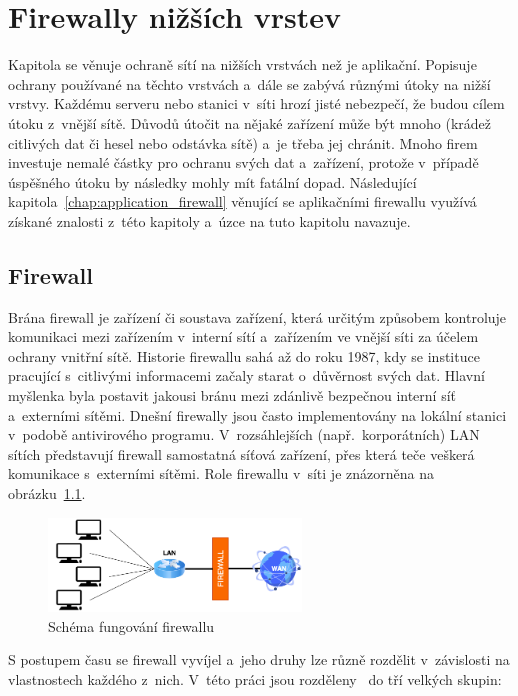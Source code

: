 \chapter{Firewally nižších vrstev}
\label{chap:network_protection}
Kapitola se věnuje ochraně sítí na nižších vrstvách než je aplikační. Popisuje ochrany používané na těchto vrstvách a~dále se zabývá různými útoky na nižší vrstvy. Každému serveru nebo stanici v~síti hrozí jisté nebezpečí, že budou cílem útoku z~vnější sítě. Důvodů útočit na nějaké zařízení může být mnoho (krádež citlivých dat či hesel nebo odstávka sítě) a~je třeba jej chránit. Mnoho firem investuje nemalé částky pro ochranu svých dat a~zařízení, protože v~případě úspěšného útoku by následky mohly mít fatální dopad. Následující kapitola~\ref{chap:application_firewall} věnující se aplikačními firewallu využívá získané znalosti z~této kapitoly a~úzce na tuto kapitolu navazuje.

\section{Firewall}
Brána firewall je zařízení či soustava zařízení, která určitým způsobem kontroluje komunikaci mezi zařízením v~interní sítí a~zařízením ve vnější síti za účelem ochrany vnitřní sítě. Historie firewallu sahá až do roku 1987, kdy se instituce pracující s~citlivými informacemi začaly starat o~důvěrnost svých dat. Hlavní myšlenka byla postavit jakousi bránu mezi zdánlivě bezpečnou interní síť a~externími sítěmi. Dnešní firewally jsou často implementovány na lokální stanici v~podobě antivirového programu. V~rozsáhlejších (např.~korporátních) LAN sítích představují firewall samostatná síťová zařízení, přes která teče veškerá komunikace s~externími sítěmi. Role firewallu v~síti je znázorněna na obrázku~\ref{img:firewall}.

\begin{figure}[hbt]
	\centering
	\includegraphics[width=0.6\textwidth]{images/firewall.png}
	\caption{Schéma fungování firewallu}
	\label{img:firewall}
\end{figure}

\noindent
S postupem času se firewall vyvíjel a~jeho druhy lze různě rozdělit v~závislosti na vlastnostech každého z~nich. V~této práci jsou rozděleny~\cite{bib:firewall} do tří velkých skupin: 

